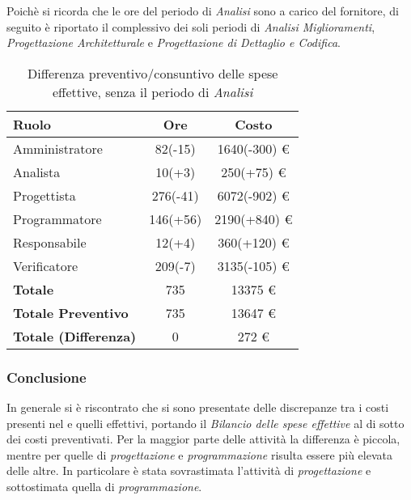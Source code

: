 Poich\`e si ricorda che le ore del periodo di \textit{Analisi} sono a carico del fornitore, di seguito \`e riportato il  complessivo dei soli periodi di \textit{Analisi Miglioramenti}, \textit{Progettazione Architetturale} e \textit{Progettazione di Dettaglio e Codifica}.

\begin{table}[H]
	\centering
	\begin{tabular}{ l c c }
		\textbf{Ruolo} & \textbf{Ore} & \textbf{Costo} \\
		\hline
		Amministratore & 82(-15) & 1640(-300) \euro{} \\
		Analista & 10(+3) & 250(+75) \euro{} \\
		Progettista & 276(-41) & 6072(-902) \euro{} \\
		Programmatore & 146(+56) & 2190(+840) \euro{} \\
		Responsabile & 12(+4) & 360(+120) \euro{} \\
		Verificatore & 209(-7) & 3135(-105) \euro{} \\
		\hline
		\textbf{Totale \glossaryItem{Consuntivo}} & 735 & 13375 \euro{} \\
		\hline
		\textbf{Totale Preventivo} & 735 & 13647 \euro{} \\
		\hline
		\textbf{Totale (Differenza)} & 0 & 272 \euro{} \\
		\hline
	\end{tabular}
	\caption{Differenza preventivo/consuntivo delle spese effettive, senza il periodo di \textit{Analisi}}
\end{table}




\subsubsection{Conclusione}
In generale si \`e riscontrato che si sono presentate delle discrepanze tra i costi presenti nel  e quelli effettivi, portando il \textit{Bilancio delle spese effettive} al di sotto dei costi preventivati. 
Per la maggior parte delle attivit\`a la differenza \`e piccola, mentre per quelle di \textit{progettazione} e \textit{programmazione} risulta essere pi\`u elevata delle altre.
In particolare \`e stata sovrastimata l'attivit\`a di \textit{progettazione} e sottostimata quella di \textit{programmazione}.






\newpage
